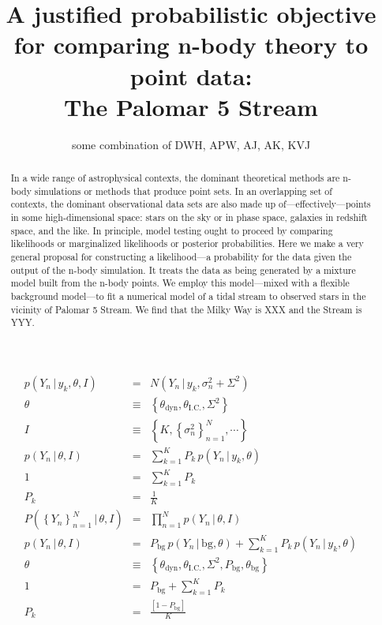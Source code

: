 \documentclass[12pt,pdftex,preprint]{aastex}
\newcommand{\setof}[1]{\left\{{#1}\right\}}
\newcommand{\given}{\,|\,}
\newcommand{\bg}{\mathrm{bg}}
\newcommand{\dyn}{\mathrm{dyn}}
\newcommand{\ic}{\mathrm{I.C.}}
\begin{document}
\title{A justified probabilistic objective \\ for comparing n-body theory to point data: \\ The Palomar 5 Stream}
\author{some combination of DWH, APW, AJ, AK, KVJ}

\begin{abstract}
In a wide range of astrophysical contexts, the dominant theoretical
methods are n-body simulations or methods that produce point sets.  In
an overlapping set of contexts, the dominant observational data sets
are also made up of---effectively---points in some high-dimensional
space: stars on the sky or in phase space, galaxies in redshift space,
and the like.  In principle, model testing ought to proceed by
comparing likelihoods or marginalized likelihoods or posterior
probabilities.  Here we make a very general proposal for constructing
a likelihood---a probability for the data given the output of the
n-body simulation.  It treats the data as being generated by a mixture
model built from the n-body points.  We employ this model---mixed with
a flexible background model---to fit a numerical model of a tidal
stream to observed stars in the vicinity of Palomar 5 Stream.  We find
that the Milky Way is XXX and the Stream is YYY.
\end{abstract}

\begin{eqnarray}
p(Y_n\given y_k,\theta,I) &=& N(Y_n\given y_k,\sigma^2_n+\Sigma^2)
\\
\theta &\equiv& \setof{\theta_\dyn, \theta_\ic, \Sigma^2}
\\
I &\equiv& \setof{K, \setof{\sigma^2_n}_{n=1}^N, \cdots}
\\
p(Y_n\given\theta,I) &=& \sum_{k=1}^K P_k\,p(Y_n\given y_k,\theta)
\\
1 &=& \sum_{k=1}^K P_k
\\
P_k &=& \frac{1}{K}
\\
P(\setof{Y_n}_{n=1}^N\given\theta,I) &=& \prod_{n=1}^N p(Y_n\given\theta,I)
\\
p(Y_n\given\theta,I) &=& P_\bg\,p(Y_n\given \bg,\theta) + \sum_{k=1}^K P_k\,p(Y_n\given y_k,\theta)
\\
\theta &\equiv& \setof{\theta_\dyn, \theta_\ic, \Sigma^2, P_\bg, \theta_\bg}
\\
1 &=& P_\bg + \sum_{k=1}^K P_k
\\
P_k &=& \frac{[1 - P_\bg]}{K}
\end{eqnarray}
\end{document}
